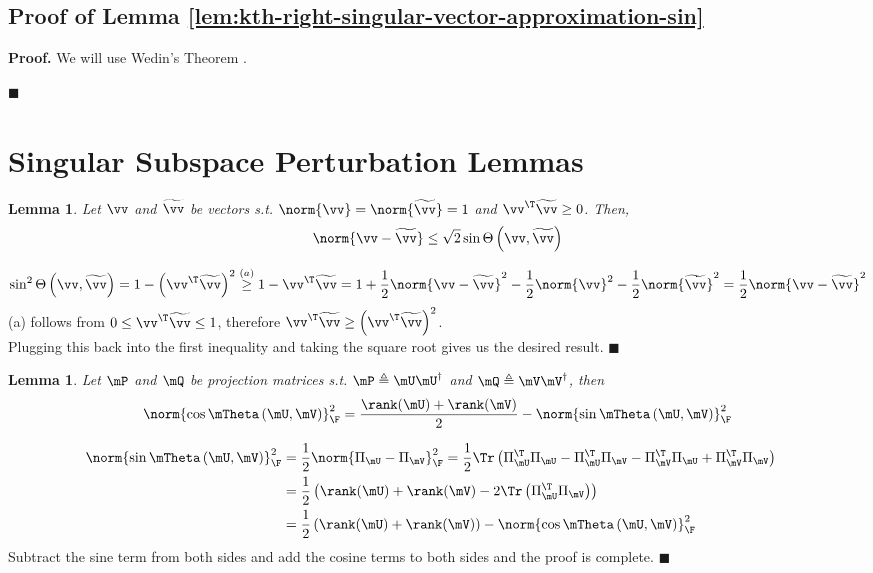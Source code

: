 \documentclass[10pt]{article}
\theoremstyle{plain}
\newtheorem{lemma}[theorem]{Lemma}
\theoremstyle{definition}
\theoremstyle{remark}
\begin{document}
\subsection{Proof of Lemma \ref{lem:kth-right-singular-vector-approximation-sin}}
{\bf Proof.}
We will use Wedin's Theorem \cite{wedin:1972}. 

\hfill $\blacksquare$

\clearpage
\section{Singular Subspace Perturbation Lemmas}
\begin{lemma} \label{lem:sine-vector-difference}
	Let $\vv$ and $\widetilde{\vv}$ be vectors s.t. $\norm{\vv} = \norm{\widetilde{\vv}} = 1$ and $\vv^{\T}\widetilde{\vv} \geq 0$. Then,
	\begin{equation}
		\norm{\vv - \widetilde{\vv}} \leq \sqrt{2}\sin\Theta\left(\vv,\widetilde{\vv}\right)
	\end{equation}
\end{lemma}
\begin{equation}
	\sin^2\Theta\left(\vv,\widetilde{\vv}\right) = 1 - \left(\vv^{\T}\widetilde{\vv}\right)^2 \overset{(a)}{\geq} 1 - \vv^{\T}\widetilde{\vv} = 1 + \frac{1}{2}\norm{\vv - \widetilde{\vv}}^2 - \frac{1}{2} \norm{\vv}^2 - \frac{1}{2}\norm{\widetilde{\vv}}^2 = \frac{1}{2}\norm{\vv - \widetilde{\vv}}^2
\end{equation}
(a) follows from $0 \leq \vv^{\T}\widetilde{\vv} \leq 1$, therefore $\vv^{\T}\widetilde{\vv} \geq \left(\vv^{\T}\widetilde{\vv}\right)^2$. \\
Plugging this back into the first inequality and taking the square root gives us the desired result.
\hfill $\blacksquare$
\begin{lemma} \label{lem:sine-cosine-relation}
	Let $\mP$ and $\mQ$ be projection matrices s.t. $\mP \triangleq \mU\mU^{\dagger}$ and $\mQ \triangleq \mV\mV^{\dagger}$, then
	\begin{equation}
		\norm{\cos\mTheta\left(\mU,\mV\right)}_{\F}^2 = \frac{\rank(\mU)+\rank(\mV)}{2} - \norm{\sin\mTheta\left(\mU,\mV\right)}_{\F}^2 
	\end{equation}
\end{lemma}
\begin{align}
	\norm{\sin\mTheta\left(\mU,\mV\right)}_{\F}^2 &= \frac{1}{2}\norm{\Pi_{\mU}-\Pi_{\mV}}_{\F}^2 = \frac{1}{2}\Tr\left(\Pi_{\mU}^{\T}\Pi_{\mU} - \Pi_{\mU}^{\T}\Pi_{\mV} - \Pi_{\mV}^{\T}\Pi_{\mU} + \Pi_{\mV}^{\T}\Pi_{\mV}\right) &&\\
	&= \frac{1}{2}\left(\rank(\mU) + \rank(\mV) - 2\Tr\left(\Pi_{\mU}^{\T}\Pi_{\mV}\right)\right) &&\\
	&= \frac{1}{2}\left(\rank(\mU) + \rank(\mV)\right) - \norm{\cos\mTheta\left(\mU,\mV\right)}_{\F}^2 &&
\end{align}
Subtract the sine term from both sides and add the cosine terms to both sides and the proof is complete.
\hfill $\blacksquare$
\clearpage
\end{document}
